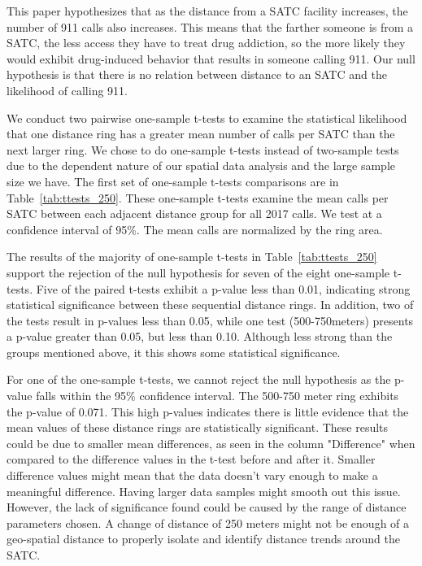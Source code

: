 \documentclass[12pt]{article}
\begin{document}
This paper hypothesizes that as the distance from a SATC facility increases, the number of 911 calls also increases. This means that the farther someone is from a SATC, the less access they have to treat drug addiction, so the more likely they would exhibit drug-induced behavior that results in someone calling 911. Our null hypothesis is that there is no relation between distance to an SATC and the likelihood of calling 911.
 
We conduct two pairwise one-sample t-tests to examine the statistical likelihood that one distance ring has a greater mean number of calls per SATC than the next larger ring. We chose to do one-sample t-tests instead of two-sample tests due to the dependent nature of our spatial data analysis and the large sample size we have. The first set of one-sample t-tests comparisons are in Table~\ref{tab:ttests_250}. These one-sample t-tests examine the mean calls per SATC between each adjacent distance group for all 2017 calls. We test at a confidence interval of 95\%. The mean calls are normalized by the ring area. 

The results of the majority of one-sample t-tests in Table~\ref{tab:ttests_250} support the rejection of the null hypothesis for seven of the eight one-sample t-tests. Five of the paired t-tests exhibit a p-value less than 0.01, indicating strong statistical significance between these sequential distance rings. In addition, two of the tests result in p-values less than 0.05, while one test (500-750meters) presents a p-value greater than 0.05, but less than 0.10. Although less strong than the groups mentioned above, it this shows some statistical significance. 

\label{tabl:Table4}

For one of the one-sample t-tests, we cannot reject the null hypothesis as the p-value falls within the 95\% confidence interval. The 500-750 meter ring exhibits the p-value of 0.071. This high p-values indicates there is little evidence that the mean values of these distance rings are statistically significant. These results could be due to smaller mean differences, as seen in the column "Difference" when compared to the difference values in the t-test before and after it. Smaller difference values might mean that the data doesn't vary enough to make a meaningful difference. Having larger data samples might smooth out this issue. However, the lack of significance found could be caused by the range of distance parameters chosen. A change of distance of 250 meters might not be enough of a geo-spatial distance to properly isolate and identify distance trends around the SATC. 
\end{document}
